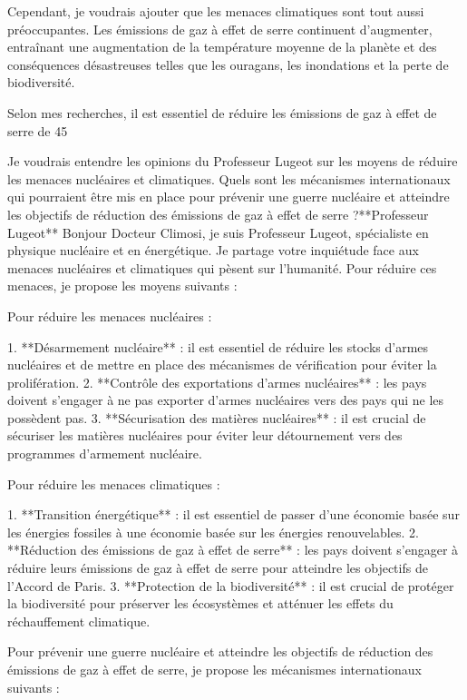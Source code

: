 Cependant, je voudrais ajouter que les menaces climatiques sont tout aussi préoccupantes. Les émissions de gaz à effet de serre continuent d'augmenter, entraînant une augmentation de la température moyenne de la planète et des conséquences désastreuses telles que les ouragans, les inondations et la perte de biodiversité.

Selon mes recherches, il est essentiel de réduire les émissions de gaz à effet de serre de 45%

Je voudrais entendre les opinions du Professeur Lugeot sur les moyens de réduire les menaces nucléaires et climatiques. Quels sont les mécanismes internationaux qui pourraient être mis en place pour prévenir une guerre nucléaire et atteindre les objectifs de réduction des émissions de gaz à effet de serre ?**Professeur Lugeot**
Bonjour Docteur Climosi, je suis Professeur Lugeot, spécialiste en physique nucléaire et en énergétique. Je partage votre inquiétude face aux menaces nucléaires et climatiques qui pèsent sur l'humanité. Pour réduire ces menaces, je propose les moyens suivants :

 Pour réduire les menaces nucléaires :

1. **Désarmement nucléaire** : il est essentiel de réduire les stocks d'armes nucléaires et de mettre en place des mécanismes de vérification pour éviter la prolifération.
2. **Contrôle des exportations d'armes nucléaires** : les pays doivent s'engager à ne pas exporter d'armes nucléaires vers des pays qui ne les possèdent pas.
3. **Sécurisation des matières nucléaires** : il est crucial de sécuriser les matières nucléaires pour éviter leur détournement vers des programmes d'armement nucléaire.

 Pour réduire les menaces climatiques :

1. **Transition énergétique** : il est essentiel de passer d'une économie basée sur les énergies fossiles à une économie basée sur les énergies renouvelables.
2. **Réduction des émissions de gaz à effet de serre** : les pays doivent s'engager à réduire leurs émissions de gaz à effet de serre pour atteindre les objectifs de l'Accord de Paris.
3. **Protection de la biodiversité** : il est crucial de protéger la biodiversité pour préserver les écosystèmes et atténuer les effets du réchauffement climatique.

 Pour prévenir une guerre nucléaire et atteindre les objectifs de réduction des émissions de gaz à effet de serre, je propose les mécanismes internationaux suivants :

